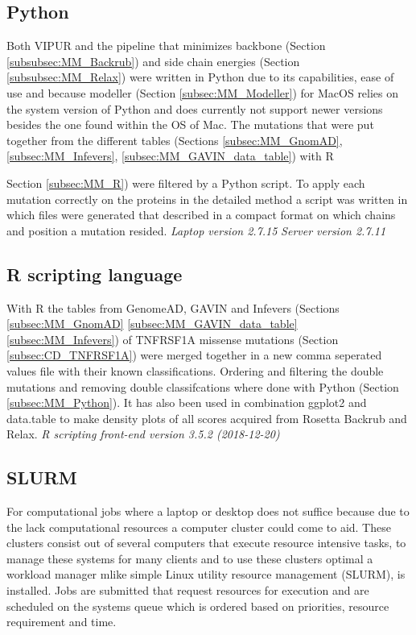 \subsection{Python}
Both VIPUR and the pipeline that minimizes backbone (Section \ref{subsubsec:MM_Backrub}) and side chain energies (Section \ref{subsubsec:MM_Relax}) were written in Python due to its capabilities, ease of use and because modeller (Section \ref{subsec:MM_Modeller}) for MacOS relies on the system version of Python and does currently not support newer versions besides the one found within the OS of Mac. The mutations that were put together from the different tables (Sections \ref{subsec:MM_GnomAD}, \ref{subsec:MM_Infevers}, \ref{subsec:MM_GAVIN_data_table}) with R {Section \ref{subsec:MM_R}) were filtered by a Python script. To apply each mutation correctly on the proteins in the detailed method a script was written in which files were generated that described in a compact format on which chains and position a mutation resided.
\label{subsec:MM_Python}
\newline
\textit{Laptop version 2.7.15}
\newline
\textit{Server version 2.7.11}

\subsection{R scripting language}
With R the tables from GenomeAD, GAVIN and Infevers (Sections \ref{subsec:MM_GnomAD} \ref{subsec:MM_GAVIN_data_table} \ref{subsec:MM_Infevers}) of TNFRSF1A missense mutations (Section \ref{subsec:CD_TNFRSF1A}) were merged together in a new comma seperated values file with their known classifications. Ordering and filtering the double mutations and removing double classifcations where done with Python (Section \ref{subsec:MM_Python}). It has also been used in combination ggplot2 and data.table to make density plots of all scores acquired from Rosetta Backrub and Relax.
\label{subsec:MM_R}
\newline
\textit{R scripting front-end version 3.5.2 (2018-12-20)}

\subsection{SLURM}
For computational jobs where a laptop or desktop does not suffice because due to the lack computational resources a computer cluster could come to aid. These clusters consist out of several computers that execute resource intensive tasks, to manage these systems for many clients and to use these clusters optimal a workload manager mlike simple Linux utility resource management (SLURM), is installed. Jobs are submitted that request resources for execution and are scheduled on the systems queue which is ordered based on priorities, resource requirement and time.
\label{subsec:MM_SLURM}

}
